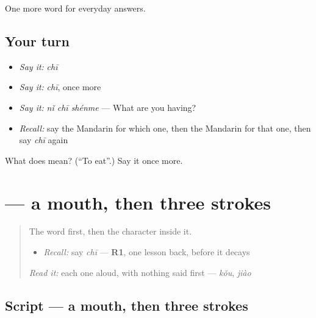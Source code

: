 \begin{grammarlens}[title={What you've built}]
One more word for everyday answers.
\end{grammarlens}

\subsection*{Your turn}
\begin{itemize}
\raggedright
  \item \emph{Say it:} \emph{chī}
  \item \emph{Say it:} \emph{chī}, once more
  \item \emph{Say it:} \emph{nǐ chī shénme} — What are you having?
  \item \emph{Recall:} say the Mandarin for which one, then the Mandarin for that one, then say \emph{chī} again
\end{itemize}

\begin{tcolorbox}[breakable,colback=teal!4,colframe=teal!35!black,title={Before you move on}]
What does  mean? (\textquotedblleft{}To eat\textquotedblright{}.) Say it once more.
\end{tcolorbox}
\section[\texorpdfstring{\zh{吃} (chī)}{吃 (chī)}]{ — a mouth, then three strokes}

\label{lesson:ZH-W38-chi}



\begin{quote}
The word first, then the character inside it.

\begin{itemize}
\raggedright
  \item \emph{Recall:} say \emph{chī} — \textbf{R1}, one lesson back, before it decays
\end{itemize}

\begin{quote}
 
\end{quote}

\emph{Read it:} each one aloud, with nothing said first — \emph{kǒu}, \emph{jiào}
\end{quote}

\subsection*{Script — a mouth, then three strokes}

